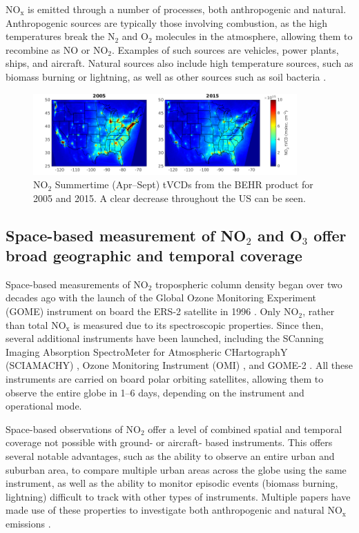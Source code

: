\documentclass[a4paper,10pt,oneside]{article}
\newcommand{\ce}[1]{$\mathrm{#1}$}
\begin{document}
\begin{sloppy}
\ce{NO_x} is emitted through a number of processes, both anthropogenic and natural. Anthropogenic sources are typically those involving combustion, as the high temperatures break the \ce{N_2} and \ce{O_2} molecules in the atmosphere, allowing them to recombine as \ce{NO} or \ce{NO_2}. Examples of such sources are vehicles, power plants, ships, and aircraft. Natural sources also include high temperature sources, such as biomass burning or lightning, as well as other sources such as soil bacteria \cite{monks-beirle}.

\begin{figure}
\centering
\includegraphics[width=0.9\textwidth]{figs/no2vcds.png} 
\caption{\ce{NO_2} Summertime (Apr--Sept) tVCDs from the BEHR product for 2005 and 2015. A clear decrease throughout the US can be seen.}
\label{fig:sat-obs}
\end{figure}

\subsection{Space-based measurement of NO$_2$ and O$_3$ offer broad geographic and temporal coverage}

Space-based measurements of \ce{NO_2} tropospheric column density began over two decades ago with the launch of the Global Ozone Monitoring Experiment (GOME) instrument on board the ERS-2 satellite in 1996 \cite{burrows99}. Only \ce{NO_2}, rather than total \ce{NO_x} is measured due to its spectroscopic properties. Since then, several additional instruments have been launched, including the SCanning Imaging Absorption SpectroMeter for Atmospheric CHartographY (SCIAMACHY) \cite{bovensmann99}, Ozone Monitoring Instrument (OMI) \cite{levelt06}, and GOME-2 \cite{callies00}. All these instruments are carried on board polar orbiting satellites, allowing them to observe the entire globe in 1--6 days, depending on the instrument and operational mode.

Space-based observations of \ce{NO_2} offer a level of combined spatial and temporal coverage not possible with ground- or aircraft- based instruments.  This offers several notable advantages, such as the ability to observe an entire urban and suburban area, to compare multiple urban areas across the globe using the same instrument, as well as the ability to monitor episodic events (biomass burning, lightning) difficult to track with other types of instruments.  Multiple papers have made use of these properties to investigate both anthropogenic \cite{ding15, lamsal15, tong15, huang14, vinken14, gu13, miyazaki12, russell12, lin10, kim09} and natural \ce{NO_x} emissions \cite{miyazaki14, beirle10, castellanos14, mebust14, mebust13, zorner16}.


\end{sloppy}
\end{document}
